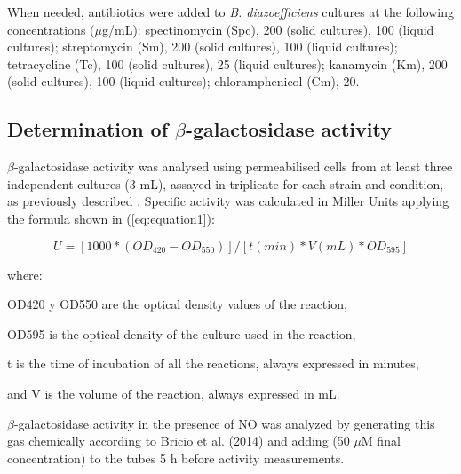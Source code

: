 \documentclass[a4paper,11pt]{article}
\begin{document}
When needed, antibiotics were added to {\em B. diazoefficiens} cultures at the following
concentrations ($\mu$g/mL): spectinomycin (Spc), 200 (solid cultures), 100 (liquid cultures);
streptomycin (Sm), 200 (solid cultures), 100 (liquid cultures); tetracycline (Tc), 100 (solid
cultures), 25 (liquid cultures); kanamycin (Km), 200 (solid cultures), 100 (liquid cultures);
chloramphenicol (Cm), 20.

\subsection{Determination of $\beta$-galactosidase activity}
$\beta$-galactosidase activity was analysed using permeabilised cells from at least three
independent cultures (3 mL), assayed in triplicate for each strain and condition, as previously
described \cite{cabrera2016integrated}. Specific activity was calculated in Miller Units \cite{miller1972miller} applying the formula shown in (\ref{eq:equation1}):

\begin{equation}
\label{eq:equation1}
U=[1000*(OD_{420}-OD_{550})]/[t(min)*V(mL)*OD_{595}]
\end{equation}

where:

OD420 y OD550 are the optical density values of the reaction,

OD595 is the optical density of the culture used in the reaction,

t is the time of incubation of all the reactions, always expressed in minutes,

and V is the volume of the reaction, always expressed in mL.


$\beta$-galactosidase activity in the presence of NO was analyzed by generating this gas chemically according
to Bricio et al. (2014) \cite{bricio2014third} and adding (50 $\mu$M final concentration) to the tubes 5 h before
activity measurements.
\end{document}
